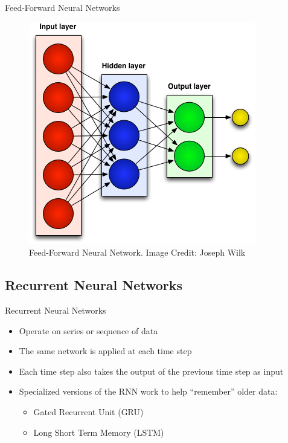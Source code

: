 \documentclass{beamer}
\begin{document}
            \begin{frame}{Feed-Forward Neural Networks}
                \begin{figure}
                    \centering
                    \includegraphics[scale=0.45]{nn-feedforward.png}
                    \caption{Feed-Forward Neural Network. Image Credit: Joseph Wilk}
                \end{figure}
            \end{frame}
    
        \subsection{Recurrent Neural Networks}
        
            \begin{frame}{Recurrent Neural Networks}
                \begin{itemize}
                    \item<2-> Operate on series or sequence of data
                    \item<3-> The same network is applied at each time step
                    \item<4-> Each time step also takes the output of the previous time step as input
                    \item<5-> Specialized versions of the RNN work to help ``remember'' older data:
                    \begin{itemize}
                        \item<6-> Gated Recurrent Unit (GRU)
                        \item<7-> Long Short Term Memory (LSTM)
                    \end{itemize}
                \end{itemize}
            \end{frame}
      
\end{document}
